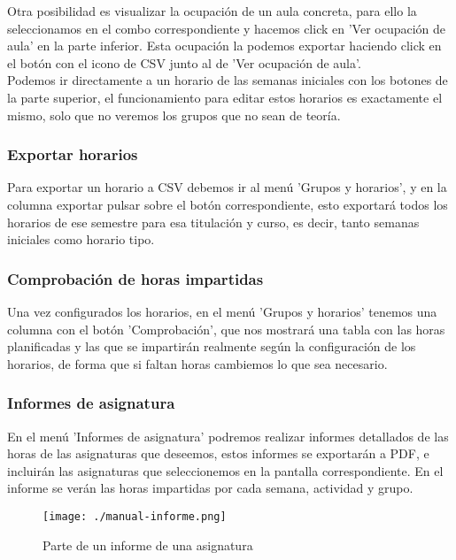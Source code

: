 Otra posibilidad es visualizar la ocupación de un aula concreta, para ello la seleccionamos en el combo correspondiente y hacemos click en 'Ver ocupación de aula' en la parte inferior. Esta ocupación la podemos exportar haciendo click en el botón con el icono de CSV junto al de 'Ver ocupación de aula'.
\\
Podemos ir directamente a un horario de las semanas iniciales con los botones de la parte superior, el funcionamiento para editar estos horarios es exactamente el mismo, solo que no veremos los grupos que no sean de teoría.

\subsubsection{Exportar horarios}

Para exportar un horario a CSV debemos ir al menú 'Grupos y horarios', y en la columna exportar pulsar sobre el botón correspondiente, esto exportará todos los horarios de ese semestre para esa titulación y curso, es decir, tanto semanas iniciales como horario tipo.

\subsubsection{Comprobación de horas impartidas}

Una vez configurados los horarios, en el menú 'Grupos y horarios' tenemos una columna con el botón 'Comprobación', que nos mostrará una tabla con las horas planificadas y las que se impartirán realmente según la configuración de los horarios, de forma que si faltan horas cambiemos lo que sea necesario.  

\subsubsection{Informes de asignatura}
En el menú 'Informes de asignatura' podremos realizar informes detallados de las horas de las asignaturas que deseemos, estos informes se exportarán a PDF, e incluirán las asignaturas que seleccionemos en la pantalla correspondiente. En el informe se verán las horas impartidas por cada semana, actividad y grupo.

\begin{figure}[H] 
  \label{manual-informe} 
	\begin{center}
    \texttt{[image: ./manual-informe.png]}
  \end{center}
\caption{Parte de un informe de una asignatura}
\end{figure}


